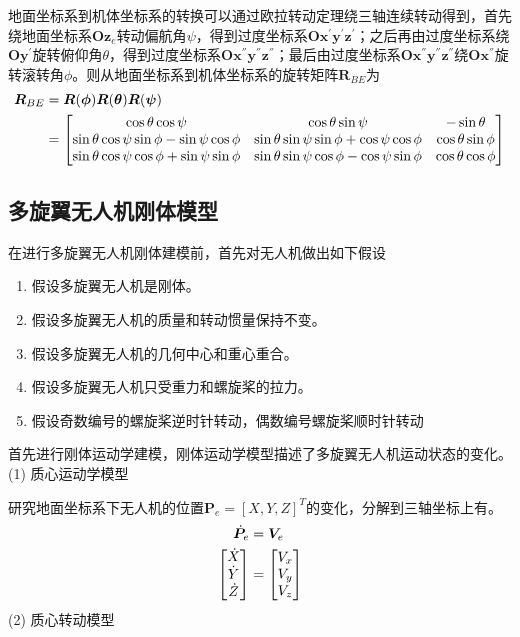 地面坐标系到机体坐标系的转换可以通过欧拉转动定理绕三轴连续转动得到，首先绕地面坐标系$\boldsymbol{O} \boldsymbol{z}_e$转动偏航角$\psi$，得到过度坐标系$\boldsymbol{O} \boldsymbol{x}^{'} \boldsymbol{y}^{'} \boldsymbol{z}^{'}$；之后再由过度坐标系绕$\boldsymbol{O} \boldsymbol{y}^{'}$旋转俯仰角$\theta$，得到过度坐标系$\boldsymbol{O} \boldsymbol{x}^{''} \boldsymbol{y}^{''} \boldsymbol{z}^{''}$；最后由过度坐标系$\boldsymbol{O} \boldsymbol{x}^{''} \boldsymbol{y}^{''} \boldsymbol{z}^{''}$绕$\boldsymbol{O} \boldsymbol{x}^{''}$旋转滚转角$\phi$。则从地面坐标系到机体坐标系的旋转矩阵$\boldsymbol{R}_{BE}$为
\begin{equation}
\label{equ2.1}
\begin{aligned}
\boldsymbol{R}_{BE} 
&= \boldsymbol{R}(\boldsymbol{\phi}) \boldsymbol{R}(\boldsymbol{\theta}) \boldsymbol{R}(\boldsymbol{\psi}) \\ 
&= 
\begin{bmatrix}
\cos\theta \cos\psi & \cos\theta \sin\psi & -\sin\theta \cr
\sin\theta \cos\psi \sin\phi - \sin\psi \cos\phi & \sin\theta \sin\psi \sin\phi + \cos\psi \cos\phi & \cos\theta \sin\phi \cr
\sin\theta \cos\psi \cos\phi + \sin\psi \sin\phi & \sin\theta \sin\psi \cos\phi - \cos\psi \sin\phi & \cos\theta \cos\phi \cr
\end{bmatrix}
\end{aligned}
\end{equation}

\subsection{多旋翼无人机刚体模型}
在进行多旋翼无人机刚体建模前，首先对无人机做出如下假设
\begin{enumerate}  [itemindent=1em,label={(\arabic*)}]
\item 假设多旋翼无人机是刚体。
\item 假设多旋翼无人机的质量和转动惯量保持不变。
\item 假设多旋翼无人机的几何中心和重心重合。
\item 假设多旋翼无人机只受重力和螺旋桨的拉力。
\item 假设奇数编号的螺旋桨逆时针转动，偶数编号螺旋桨顺时针转动
\end{enumerate}
首先进行刚体运动学建模，刚体运动学模型描述了多旋翼无人机运动状态的变化。\\
(1) 质心运动学模型

研究地面坐标系下无人机的位置$\boldsymbol{P}_e = [X,Y,Z]^T$的变化，分解到三轴坐标上有。
\begin{equation}
\label{equ2.2}
\begin{aligned}
\dot{\boldsymbol{P}}_e &= \boldsymbol{V}_e \\
\begin{bmatrix}
\dot{X} \cr \dot{Y} \cr \dot{Z} \cr
\end{bmatrix}
&=
\begin{bmatrix}
V_x \cr V_y \cr V_z \cr
\end{bmatrix}
\end{aligned}
\end{equation}
(2) 质心转动模型

